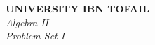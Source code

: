 \documentclass[12pt]{article}
\begin{document}
                                                                                                                                                                                                                         
                                                                                                                                                                                                                                         
\begin{center}                                                                                                                                                                                                                           
	\Large\textbf{UNIVERSITY IBN TOFAIL} \\[1em]                                                                                                                                                                                           
	\large\textit{Algebra II} \\[2em]                                                                                                                                                                                                     
	\large\textit{Problem Set I} \\[0.5em]                                                                                                                                                                                                 
\end{center}                                                                                                                                                                                                                             
                                                                                                                                                                                                                                         
\vspace{1cm}                                                                                                                                                                                                                             
                                                                                                                                                                                                                                         
\end{document}
